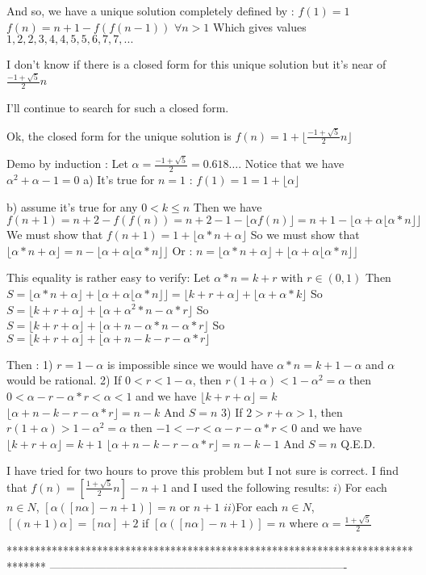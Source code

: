 \begin{mysolution}
	\begin{tcolorbox} And so, we have a unique solution completely defined by :
$f(1)=1$
$f(n)=n+1-f(f(n-1))$ $\forall n>1$
Which gives values $1,2,2,3,4,4,5,5,6,7,7,...$

I don't know if there is a closed form for this unique solution but it's near of $\frac{-1+\sqrt{5}}{2}n$

I'll continue to search for such a closed form.\end{tcolorbox}

Ok, the closed form for the unique solution  is $f(n)=1+\lfloor\frac{-1+\sqrt{5}}{2}n\rfloor$

Demo by induction :
Let $\alpha=\frac{-1+\sqrt{5}}{2}=0.618\ldots$. Notice that we have $\alpha^{2}+\alpha-1=0$
a) It's true for $n=1$ : $f(1)=1=1+\lfloor\alpha\rfloor$

b) assume it's true for any $0<k\leq n$
Then we have $f(n+1)=n+2-f(f(n))=n+2-1-\lfloor\alpha f(n)\rfloor=n+1-\lfloor\alpha+\alpha\lfloor\alpha*n\rfloor\rfloor$
We must show that $f(n+1)=1+\lfloor\alpha*n+\alpha\rfloor$
So we must show that $\lfloor\alpha*n+\alpha\rfloor=n-\lfloor\alpha+\alpha\lfloor\alpha*n\rfloor\rfloor$
Or : $n = \lfloor\alpha*n+\alpha\rfloor+\lfloor\alpha+\alpha\lfloor\alpha*n\rfloor\rfloor$

This equality is rather easy to verify:
Let $\alpha*n=k+r$ with $r\in(0,1)$
Then $S=\lfloor\alpha*n+\alpha\rfloor+\lfloor\alpha+\alpha\lfloor\alpha*n\rfloor\rfloor=\lfloor k+r+\alpha\rfloor+\lfloor\alpha+\alpha*k\rfloor$
So $S=\lfloor k+r+\alpha\rfloor+\lfloor\alpha+\alpha^{2}*n-\alpha*r\rfloor$
So $S=\lfloor k+r+\alpha\rfloor+\lfloor\alpha+n-\alpha*n-\alpha*r\rfloor$
So $S=\lfloor k+r+\alpha\rfloor+\lfloor\alpha+n-k-r-\alpha*r\rfloor$

Then :
1) $r=1-\alpha$ is impossible since we would have $\alpha*n=k+1-\alpha$ and $\alpha$ would be rational.
2) If $0<r<1-\alpha$, then $r(1+\alpha)<1-\alpha^{2}=\alpha$ then $0<\alpha-r-\alpha*r<\alpha<1$ and we have
$\lfloor k+r+\alpha\rfloor=k$
$\lfloor\alpha+n-k-r-\alpha*r\rfloor=n-k$
And $S=n$
3) If $2>r+\alpha>1$, then $r(1+\alpha)>1-\alpha^{2}=\alpha$ then $-1<-r<\alpha-r-\alpha*r<0$ and we have
$\lfloor k+r+\alpha\rfloor=k+1$
$\lfloor\alpha+n-k-r-\alpha*r\rfloor=n-k-1$
And $S=n$
Q.E.D.
\end{mysolution}



\begin{mysolution}
	I have tried for two hours to prove this problem but I not sure is correct.
I find that $f(n)=[\frac{1+\sqrt{5}}{2}n]-n+1$ and I used the following results:
$i)$ For each $n\in N$, $[\alpha([n\alpha]-n+1)]=n$ or $n+1$
$ii)$For each $n\in N$, $[(n+1)\alpha]=[n\alpha]+2$ if $[\alpha([n\alpha]-n+1)]=n$
where $\alpha=\frac{1+\sqrt{5}}{2}$
\end{mysolution}
*******************************************************************************
-------------------------------------------------------------------------------


